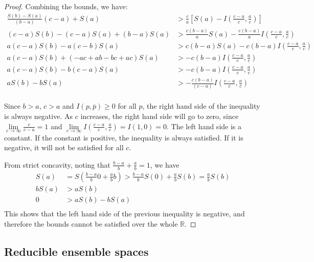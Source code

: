 \begin{proof}
	Combining the bounds, we have:
	\begin{equation}
		\begin{aligned}
			\frac{S(b) - S(a)}{(b-a)} (c-a) + S(a) &> \frac{c}{a} \left[ S(a) - I\left(\frac{c-a}{c}, \frac{a}{c}\right) \right] \\
			(c-a) S(b) - (c-a)S(a) + (b-a) S(a) &> \frac{c(b-a)}{a} S(a) - \frac{c(b-a)}{a} I\left(\frac{c-a}{c}, \frac{a}{c}\right) \\
			a (c-a) S(b) - a(c-b) S(a) &> c(b-a)S(a) - c(b-a) I\left(\frac{c-a}{c}, \frac{a}{c}\right) \\
			a (c-a) S(b) + (-ac +ab -bc +ac) S(a) &> - c(b-a) I\left(\frac{c-a}{c}, \frac{a}{c}\right) \\
			a (c-a) S(b) -b (c-a) S(a) &> - c(b-a) I\left(\frac{c-a}{c}, \frac{a}{c}\right) \\
			a  S(b) - b S(a) &> - \frac{c(b-a)}{(c-a)} I\left(\frac{c-a}{c}, \frac{a}{c}\right) \\
		\end{aligned}
	\end{equation}
	
	Since $b > a$, $c > a$ and $I(p,\bar{p}) \geq 0$ for all $p$, the right hand side of the inequality is always negative. As $c$ increases, the right hand side will go to zero, since $\lim\limits_{c\to \infty}\frac{c}{c-a} = 1$ and $\lim\limits_{c\to \infty} I\left(\frac{c-a}{c}, \frac{a}{c}\right) = I(1,0) = 0$. The left hand side is a constant. If the constant is positive, the inequality is always satisfied. If it is negative, it will not be satisfied for all $c$.
	
	From strict concavity, noting that $\frac{b-a}{b} + \frac{a}{b} = 1$, we have
	\begin{equation}
		\begin{aligned}
			S(a) &= S\left(\frac{b-a}{b} 0 + \frac{a}{b} b\right) > \frac{b-a}{b} S(0) + \frac{a}{b} S(b) = \frac{a}{b} S(b)\\
			b S(a) &> a S(b)  \\
			0 &> a S(b) - b S(a)\\
		\end{aligned}
	\end{equation}
	This shows that the left hand side of the previous inequality is negative, and therefore the bounds cannot be satisfied over the whole $\mathbb{R}$.
\end{proof}


\subsection{Reducible ensemble spaces}

